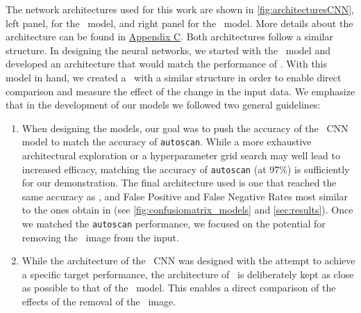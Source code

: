 The network architectures used for this work are shown in  \autoref{fig:architecturesCNN}, left panel, for the \diabased\ model, and right  panel for the \nodia\ model. More details about the architecture can be found in \hyperref[sec:appendixb]{Appendix C}. Both architectures follow a similar structure. In designing the neural networks, we started with the \diabased\ model and developed an architecture that would match the performance of \citet{Goldstein_2015}.  With this model in hand, we created a \nodia\ with a similar structure in order to enable direct comparison and measure the effect of the change in the input data. 
We emphasize that in the development of our models we followed two general guidelines: 
\begin{enumerate}
\item When designing the models, our goal was to push the accuracy of the  \diabased\ CNN model to match the accuracy of \texttt{autoscan}. While a more exhaustive architectural exploration or a hyperparameter grid search may well lead to increased efficacy, matching the accuracy of \texttt{autoscan} (at 97\%) is sufficiently for our demonstration. 
  The final architecture used is one that reached the same accuracy as \citet{Goldstein_2015}, and  False Positive and False Negative Rates most similar to the ones obtain in \citet{Goldstein_2015}  (see \autoref{fig:confusiomatrix_models} and \autoref{sec:results}). Once we matched the \texttt{autoscan} performance, we focused on the potential for removing the \diff\ image from the input.
\item While the architecture of the \diabased\ CNN was designed with the attempt to achieve a specific target performance, the architecture of \nodia\ is deliberately kept as close as possible to that of the \diabased\ model. This enables a direct comparison of the effects of the removal of the \diff\ image. 

\end{enumerate}
